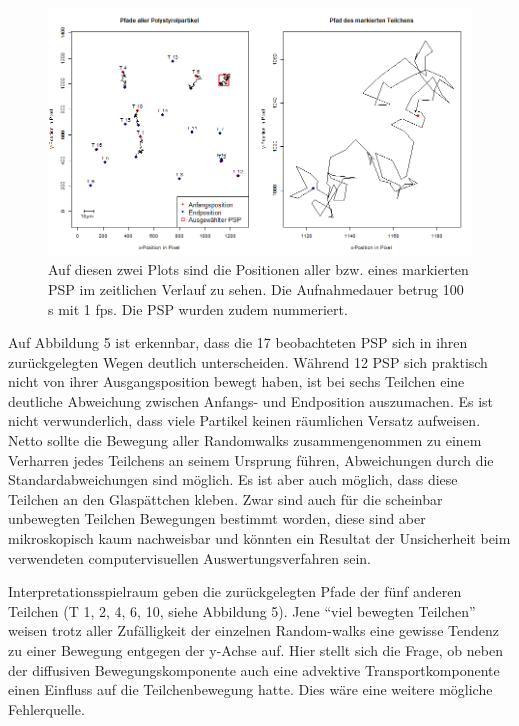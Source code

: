 \documentclass[
  9pt,
]{article}
\begin{document}
\begin{figure}
\centering
\includegraphics[width=\textwidth,height=0.4\textheight]{code/Plots/Raum.png}
\caption{Auf diesen zwei Plots sind die Positionen aller bzw. eines
markierten PSP im zeitlichen Verlauf zu sehen. Die Aufnahmedauer betrug
100 s mit 1 fps. Die PSP wurden zudem nummeriert.}
\end{figure}

Auf Abbildung 5 ist erkennbar, dass die 17 beobachteten PSP sich in
ihren zurückgelegten Wegen deutlich unterscheiden. Während 12 PSP sich
praktisch nicht von ihrer Ausgangsposition bewegt haben, ist bei sechs
Teilchen eine deutliche Abweichung zwischen Anfangs- und Endposition
auszumachen. Es ist nicht verwunderlich, dass viele Partikel keinen
räumlichen Versatz aufweisen. Netto sollte die Bewegung aller
Randomwalks zusammengenommen zu einem Verharren jedes Teilchens an
seinem Ursprung führen, Abweichungen durch die Standardabweichungen sind
möglich. Es ist aber auch möglich, dass diese Teilchen an den
Glaspättchen kleben. Zwar sind auch für die scheinbar unbewegten
Teilchen Bewegungen bestimmt worden, diese sind aber mikroskopisch kaum
nachweisbar und könnten ein Resultat der Unsicherheit beim verwendeten
computervisuellen Auswertungsverfahren sein.

Interpretationsspielraum geben die zurückgelegten Pfade der fünf anderen
Teilchen (T 1, 2, 4, 6, 10, siehe Abbildung 5). Jene ``viel bewegten
Teilchen'' weisen trotz aller Zufälligkeit der einzelnen Random-walks
eine gewisse Tendenz zu einer Bewegung entgegen der y-Achse auf. Hier
stellt sich die Frage, ob neben der diffusiven Bewegungskomponente auch
eine advektive Transportkomponente einen Einfluss auf die
Teilchenbewegung hatte. Dies wäre eine weitere mögliche Fehlerquelle.
\end{document}
